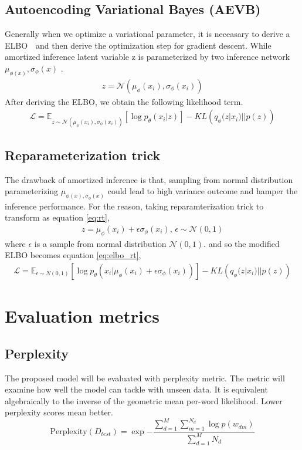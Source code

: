 \subsection{Autoencoding Variational Bayes (AEVB)}
Generally when we optimize a variational parameter, it is neceasary to derive a ELBO　and then derive the optimization step for gradient descent. While amortized inference latent variable z is parameterized by two inference network  $ \mu_{\phi(x)},\sigma_{\phi}(x) $ .
\begin{align}
z = \mathcal{N}(\mu_{\phi}(x_i), \sigma_{\phi}(x_i))
\end{align}
After deriving the ELBO, we obtain the following likelihood term.
\begin{align}
\mathcal{L}=\mathbb{E}_{z\sim\mathcal{N}(\mu_{\phi}(x_i),\sigma_\phi(x_i))}\left[\log p_\theta(x_i|z)\right]-KL\left(q_\phi(z|x_i)||p(z)\right)
\end{align}
\subsection{Reparameterization trick}
The drawback of amortized inference is that, sampling from normal distribution parameterizing $ \mu_{\phi(x),\sigma_{\phi}(x)} $ could lead to high variance outcome and hamper the inference performance. For the reason, taking reparamterization trick\cite{kingma_auto-encoding_2014} to transform as equation \ref{eq:rt},
\begin{align}\label{eq:rt}
z= \mu_{\phi}(x_i)+\epsilon\sigma_\phi(x_i)\text{, }\epsilon\sim\mathcal{N}(0,1)
\end{align}
where $ \epsilon $ is a sample from normal distribution $ \mathcal{N}(0,1) $. and so the modified ELBO becomes equation \ref{eq:elbo_rt},
\begin{align}\label{eq:elbo_rt}
\mathcal{L}=\mathbb{E}_{\epsilon\sim N(0,1)}\left[\log p_\theta(x_i|\mu_{\phi}(x_i)+\epsilon\sigma_\phi(x_i))\right]-KL\left(q_\phi(z|x_i)||p(z)\right)
\end{align}
\section{Evaluation metrics}
\subsection{Perplexity}The proposed model will be evaluated with perplexity metric. The metric will examine how well the model can tackle with unseen data. It is equivalent algebraically to the inverse of the geometric mean per-word likelihood. Lower perplexity scores mean better.\begin{equation}
\text{Perplexity}(D_{test})=\exp{{-\frac{\sum_{d=1}^{M}\sum_{m=1}^{N_d}\log p(w_{dm})}{\sum_{d=1}^{M}N_d}}}
\end{equation}
